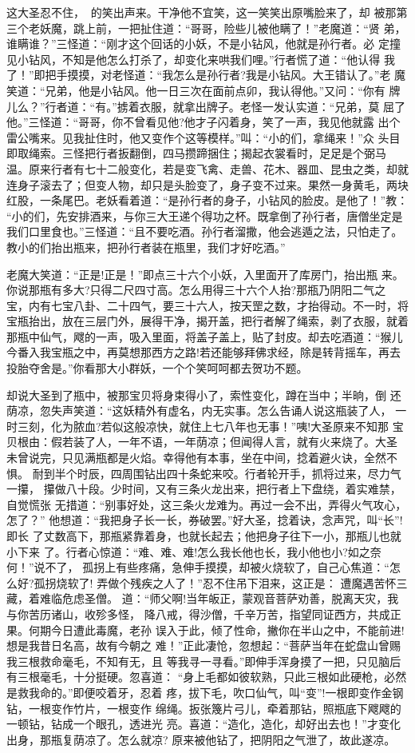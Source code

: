 这大圣忍不住，的笑出声来。干净他不宜笑，这一笑笑出原嘴脸来了，却
被那第三个老妖魔，跳上前，一把扯住道：“哥哥，险些儿被他瞒了！”老魔道：“贤
弟，谁瞒谁？”三怪道：“刚才这个回话的小妖，不是小钻风，他就是孙行者。必
定撞见小钻风，不知是他怎么打杀了，却变化来哄我们哩。”行者慌了道：“他认得
我了！”即把手摸摸，对老怪道：“我怎么是孙行者?我是小钻风。大王错认了。”老
魔笑道：“兄弟，他是小钻风。他一日三次在面前点卯，我认得他。”又问：“你有
牌儿么？”行者道：“有。”掳着衣服，就拿出牌子。老怪一发认实道：“兄弟，莫
屈了他。”三怪道：“哥哥，你不曾看见他?他才子闪着身，笑了一声，我见他就露
出个雷公嘴来。见我扯住时，他又变作个这等模样。”叫：“小的们，拿绳来！”众
头目即取绳索。三怪把行者扳翻倒，四马攒蹄捆住；揭起衣裳看时，足足是个弼马
温。原来行者有七十二般变化，若是变飞禽、走兽、花木、器皿、昆虫之类，却就
连身子滚去了；但变人物，却只是头脸变了，身子变不过来。果然一身黄毛，两块
红股，一条尾巴。老妖看着道：“是孙行者的身子，小钻风的脸皮。是他了！”教：
“小的们，先安排酒来，与你三大王递个得功之杯。既拿倒了孙行者，唐僧坐定是
我们口里食也。”三怪道：“且不要吃酒。孙行者溜撒，他会逃遁之法，只怕走了。
教小的们抬出瓶来，把孙行者装在瓶里，我们才好吃酒。”

老魔大笑道：“正是!正是！”即点三十六个小妖，入里面开了库房门，抬出瓶
来。你说那瓶有多大?只得二尺四寸高。怎么用得三十六个人抬?那瓶乃阴阳二气之
宝，内有七宝八卦、二十四气，要三十六人，按天罡之数，才抬得动。不一时，将
宝瓶抬出，放在三层门外，展得干净，揭开盖，把行者解了绳索，剥了衣服，就着
那瓶中仙气，飕的一声，吸入里面，将盖子盖上，贴了封皮。却去吃酒道：“猴儿
今番入我宝瓶之中，再莫想那西方之路!若还能够拜佛求经，除是转背摇车，再去
投胎夺舍是。”你看那大小群妖，一个个笑呵呵都去贺功不题。

却说大圣到了瓶中，被那宝贝将身束得小了，索性变化，蹲在当中；半晌，倒
还荫凉，忽失声笑道：“这妖精外有虚名，内无实事。怎么告诵人说这瓶装了人，
一时三刻，化为脓血?若似这般凉快，就住上七八年也无事！”咦!大圣原来不知那
宝贝根由：假若装了人，一年不语，一年荫凉；但闻得人言，就有火来烧了。大圣
未曾说完，只见满瓶都是火焰。幸得他有本事，坐在中间，捻着避火诀，全然不惧。
耐到半个时辰，四周围钻出四十条蛇来咬。行者轮开手，抓将过来，尽力气一攥，
攥做八十段。少时间，又有三条火龙出来，把行者上下盘绕，着实难禁，自觉慌张
无措道：“别事好处，这三条火龙难为。再过一会不出，弄得火气攻心，怎了？”
他想道：“我把身子长一长，券破罢。”好大圣，捻着诀，念声咒，叫“长”!即长
了丈数高下，那瓶紧靠着身，也就长起去；他把身子往下一小，那瓶儿也就小下来
了。行者心惊道：“难、难、难!怎么我长他也长，我小他也小?如之奈何！”说不了，
孤拐上有些疼痛，急伸手摸摸，却被火烧软了，自己心焦道：“怎么好?孤拐烧软了!
弄做个残疾之人了！”忍不住吊下泪来，这正是：
遭魔遇苦怀三藏，着难临危虑圣僧。
道：“师父啊!当年皈正，蒙观音菩萨劝善，脱离天灾，我与你苦历诸山，收殄多怪，
降八戒，得沙僧，千辛万苦，指望同证西方，共成正果。何期今日遭此毒魔，老孙
误入于此，倾了性命，撇你在半山之中，不能前进!想是我昔日名高，故有今朝之
难！”正此凄怆，忽想起：“菩萨当年在蛇盘山曾赐我三根救命毫毛，不知有无，且
等我寻一寻看。”即伸手浑身摸了一把，只见脑后有三根毫毛，十分挺硬。忽喜道：
“身上毛都如彼软熟，只此三根如此硬枪，必然是救我命的。”即便咬着牙，忍着
疼，拔下毛，吹口仙气，叫“变”!一根即变作金钢钻，一根变作竹片，一根变作
绵绳。扳张篾片弓儿，牵着那钻，照瓶底下飕飕的一顿钻，钻成一个眼孔，透进光
亮。喜道：“造化，造化，却好出去也！”才变化出身，那瓶复荫凉了。怎么就凉?
原来被他钻了，把阴阳之气泄了，故此遂凉。

